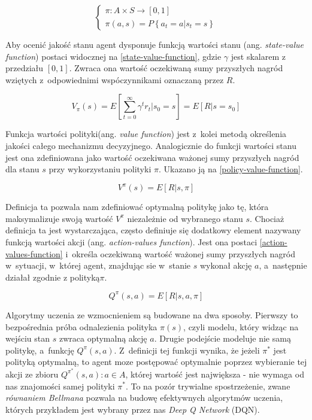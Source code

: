 \vskip 0.5cm
\begin{equation}
\begin{cases}
    \pi: A \times S \rightarrow [0,1] \\
    \pi(a,s) = P\left\{a_t = a | s_t = s\right\} 
    \label{policy}
\end{cases}
\end{equation}
\vskip 0.5cm

Aby ocenić jakość stanu agent dysponuje funkcją wartości stanu (ang. \textit{state-value function}) postaci widocznej na \ref{state-value-function}, gdzie $\gamma$ jest skalarem z przedziału $[0, 1]$. Zwraca ona wartość oczekiwaną sumy przyszłych nagród wziętych z~odpowiednimi wspóczynnikami oznaczaną przez $R$.

\vskip 0.5cm
\begin{equation}
    V_{\pi}(s) = E\left[\sum_{t=0}^{\infty} \gamma^tr_t | s_0=s\right] = E\left[R|s=s_0\right]
    \label{state-value-function}
\end{equation}
\vskip 0.5cm

Funkcja wartości polityki(ang. \textit{value function}) jest z~kolei metodą określenia jakości całego mechanizmu decyzyjnego. Analogicznie do funkcji wartości stanu jest ona zdefiniowana jako wartość oczekiwana ważonej sumy przyszłych nagród dla stanu $s$ przy wykorzystaniu polityki $\pi$. Ukazano ją na \ref{policy-value-function}.

\vskip 0.5cm
\begin{equation}
    V^{\pi}(s) = E\left[R|s, \pi\right]
    \label{policy-value-function}
\end{equation}
\vskip 0.5cm

Definicja ta pozwala nam zdefiniować optymalną politykę jako tę, która maksymalizuje swoją wartość $V^{\pi}$ niezależnie od wybranego stanu $s$. Chociaż definicja ta jest wystarczająca, często definiuje się dodatkowy element nazywany funkcją wartości akcji (ang. \textit{action-values function}). Jest ona postaci \ref{action-values-function} i~określa oczekiwaną wartość ważonej sumy przyszłych nagród w~sytuacji, w~której agent, znajdując sie w~stanie $s$ wykonał akcję $a$, a~następnie działał zgodnie z polityką$\pi$.

\vskip 0.5cm
\begin{equation}
    Q^{\pi}(s,a) = E[R|s, a, \pi]
    \label{action-values-function}
\end{equation}
\vskip 0.5cm

Algorytmy uczenia ze wzmocnieniem są budowane na dwa sposoby. Pierwszy to bezpośrednia próba odnalezienia polityka $\pi(s)$, czyli modelu, który widząc na wejściu stan $s$ zwraca optymalną akcję $a$. Drugie podejście modeluje nie samą politykę, a~funkcję $Q^{\pi}(s, a)$. Z~definicji tej funkcji wynika, że jeżeli ${\pi}^*$ jest polityką optymalną, to agent moze postępować optymalnie poprzez wybieranie tej akcji ze zbioru ${Q^{\pi^*}(s, a) : a \in A}$, której wartość jest największa - nie wymaga od nas znajomości samej polityki $\pi^*$. To na pozór trywialne spostrzeżenie, zwane \textit{równaniem Bellmana}\cite{bellman} pozwala na budowę efektywnych algorytmów uczenia, których przykładem jest wybrany przez nas \textit{Deep Q Network} (DQN). 


